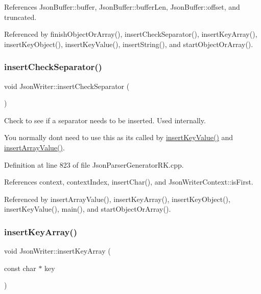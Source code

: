 References Json\+Buffer\+::buffer, Json\+Buffer\+::buffer\+Len, Json\+Buffer\+::offset, and truncated.



Referenced by finish\+Object\+Or\+Array(), insert\+Check\+Separator(), insert\+Key\+Array(), insert\+Key\+Object(), insert\+Key\+Value(), insert\+String(), and start\+Object\+Or\+Array().

\mbox{\label{class_json_writer_ab773cf0a021f402f2cef3c14694f18da}} 
\subsubsection{\texorpdfstring{insert\+Check\+Separator()}{insertCheckSeparator()}}
{\footnotesize\ttfamily void Json\+Writer\+::insert\+Check\+Separator (\begin{DoxyParamCaption}{ }\end{DoxyParamCaption})}



Check to see if a separator needs to be inserted. Used internally. 

You normally don\textquotesingle{}t need to use this as it\textquotesingle{}s called by \hyperlink{class_json_writer_ac2de627389b59ce2c8ed95e10ea213bf}{insert\+Key\+Value()} and \hyperlink{class_json_writer_a8b4dc6726b66b4f277c7674e60c8a057}{insert\+Array\+Value()}. 

Definition at line 823 of file Json\+Parser\+Generator\+R\+K.\+cpp.



References context, context\+Index, insert\+Char(), and Json\+Writer\+Context\+::is\+First.



Referenced by insert\+Array\+Value(), insert\+Key\+Array(), insert\+Key\+Object(), insert\+Key\+Value(), main(), and start\+Object\+Or\+Array().

\mbox{\label{class_json_writer_ab051477eb92a5c565ea943b8d15e1779}} 
\subsubsection{\texorpdfstring{insert\+Key\+Array()}{insertKeyArray()}\hspace{0.1cm}{\footnotesize\ttfamily [1/2]}}
{\footnotesize\ttfamily void Json\+Writer\+::insert\+Key\+Array (\begin{DoxyParamCaption}\item[{const char $\ast$}]{key }\end{DoxyParamCaption})}



